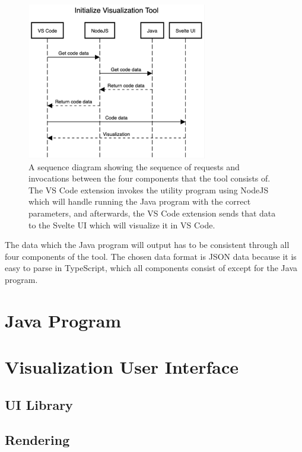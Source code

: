 \begin{figure}[t]
    \center
    \includegraphics[width=0.70\textwidth]{figures/init_tool_sequence.png}
    \caption{A sequence diagram showing the sequence of requests and invocations between the four components that the tool consists of. The VS Code extension invokes the utility program using NodeJS which will handle running the Java program with the correct parameters, and afterwards, the VS Code extension sends that data to the Svelte UI which will visualize it in VS Code.}
    \label{figure:init_tool_sequence}
\end{figure}

The data which the Java program will output has to be consistent through all
four components of the tool. The chosen data format is JSON data because it is easy to parse in TypeScript, which all components consist of except for the Java program.


\section{Java Program}

\section{Visualization User Interface}
\subsection{UI Library}
\subsection{Rendering}


